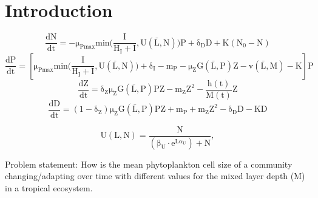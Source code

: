 \section{Introduction}
\begin{equation}
    \label{eq:Ndynamicsrand}
    \mathrm{\frac{dN}{dt} = -\mu_{Pmax}min\bigg(\frac{I}{H_I+I},U(\bar{L},N)\bigg)P+\delta_D D+K(N_0-N)}
\end{equation}
\begin{equation}
    \label{eq:Pdynamicsrand}
    \mathrm{\frac{dP}{dt} = \left[ \mu_{Pmax}min\bigg(\frac{I}{H_I+I},U(\bar{L},N)\bigg)+\delta_I-m_P-\mu_ZG(\bar{L},P)Z-v(\bar{L},M)-K \right] P}
\end{equation}
\begin{equation}
    \label{eq:Zdynamicsrand}
    \mathrm{\frac{dZ}{dt} = \delta_Z\mu_Z G(\bar{L},P)PZ-m_Z Z^2 - \frac{h(t)}{M(t)}Z}
\end{equation}
\begin{equation}
    \label{eq:Ddynamicsrand}
    \mathrm{\frac{dD}{dt} = (1-\delta_Z)\mu_Z G(\bar{L},P)PZ+m_P+m_Z Z^2-\delta_D D-KD}
\end{equation}

\begin{equation}
    \label{eq:nutrientuptakerand}
    \mathrm{U(L,N) = \frac{N}{(\beta_U\cdot e^{L\alpha_U})+N}},
\end{equation}

Problem statement: How is the mean phytoplankton cell size of a community changing/adapting over time with different values for the mixed layer depth (M) in a tropical ecosystem.